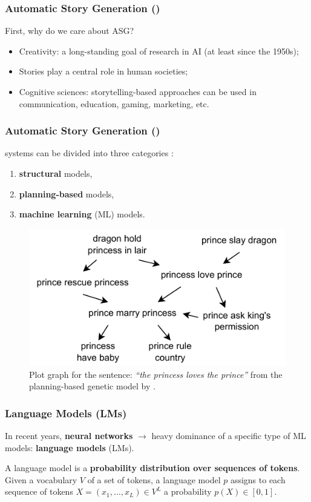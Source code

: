 \begin{frame}
    \frametitle{Automatic Story Generation ({\asg})}
    First, why do we care about ASG?
        
    \begin{itemize}[<+(1)->]
        \item Creativity: a long-standing goal of research in AI (at least since the 1950s);
        \item Stories play a central role in human societies;
        \item Cognitive sciences: storytelling-based approaches can be used in communication, education, gaming, marketing, etc.
    \end{itemize}
    
\end{frame}

\begin{frame}
    \frametitle{Automatic Story Generation ({\asg})}
    {\asg} systems can be divided into three categories \citep{alhussain2021automatic}:
    \begin{enumerate}
        \item \textbf{structural} models, 
        \item \textbf{planning-based} models,
        \item \textbf{machine learning} (ML) models.
    \end{enumerate} 
    \begin{figure}
        \centering
        \includegraphics[width=0.5\columnwidth]{pictures/plot_graph.pdf}
        \caption{Plot graph for the sentence: \emph{``the princess loves the prince''} from the planning-based genetic model by \citet{mcintyre2010plot}.}
        \label{fig:plot_graph}
    \end{figure}
\end{frame}

\begin{frame}
    \frametitle{Language Models (LMs)}
    In recent years, \textbf{neural networks} $\to$ heavy dominance of a specific type of ML models: \textbf{language models} (LMs).
    \begin{definition}
        A language model is a \textbf{probability distribution over sequences of tokens}.\\Given a vocabulary $V$ of a set of tokens, a language model $p$ assigns to each sequence of tokens $X = (x_1, \ldots, x_L) \in V^L$ a probability $p(X) \in [0,1].$
    \end{definition}
\end{frame}


